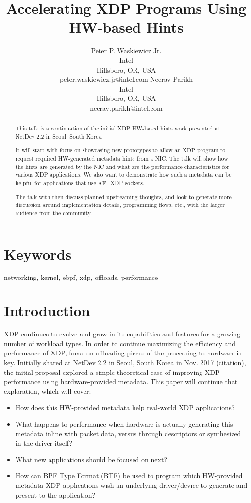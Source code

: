 \documentclass[letterpaper]{article}
\title{Accelerating XDP Programs Using HW-based Hints}
\author{Peter P. Waskiewicz Jr. \\ Intel \\ Hillsboro, OR, USA \\ peter.waskiewicz.jr@intel.com
\And Neerav Parikh \\ Intel \\ Hillsboro, OR, USA \\ neerav.parikh@intel.com
\newline
\newline
}
\begin{document}
 
\maketitle
\begin{abstract}
This talk is a continuation of the initial XDP HW-based hints work presented at NetDev 2.2 in Seoul, South Korea.

It will start with focus on showcasing new prototypes to allow an XDP program to request required HW-generated metadata hints from a NIC. The talk will show how the hints are generated by the NIC and what are the performance characteristics for various XDP applications. We also want to demonstrate how such a metadata can be helpful for applications that use AF\_XDP sockets.

The talk with then discuss planned upstreaming thoughts, and look to generate more discussion around implementation details, programming flows, etc., with the larger audience from the community.
\end{abstract}

\section{Keywords}

networking, kernel, ebpf, xdp, offloads, performance

\section{Introduction}
XDP continues to evolve and grow in its capabilities and features for a growing number of workload types.  In order to continue maximizing the efficiency and performance of XDP, focus on offloading pieces of the processing to hardware is key.  Initially shared at NetDev 2.2 in Seoul, South Korea in Nov. 2017 (citation), the initial proposal explored a simple theoretical case of improving XDP performance using hardware-provided metadata.  This paper will continue that exploration, which will cover:
\begin{itemize}
\item How does this HW-provided metadata help real-world XDP applications?
\item What happens to performance when hardware is actually generating this metadata inline with packet data, versus through descriptors or synthesized in the driver itself?
\item What new applications should be focused on next?
\item How can BPF Type Format (BTF) be used to program which HW-provided metadata XDP applications wish an underlying driver/device to generate and present to the application?
\end{itemize}
\end{document}

